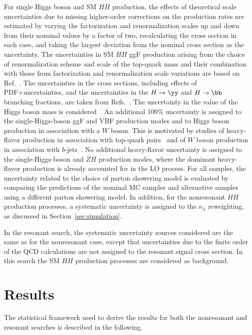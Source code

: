 \documentclass[PAPER, cernpreprint, texlive=2016, paper=a4, USenglish, texmf]{atlasdoc}
\begin{document}
For single Higgs boson and SM $HH$ production, the effects of theoretical scale uncertainties due to missing higher-order corrections on the production rates are estimated by varying the factorization and renormalization scales up and down from their nominal values by a factor of two, recalculating the cross section in each case, and taking the largest deviation from the nominal cross section as the uncertainty. The uncertainties in SM $HH$ ggF production arising from the choice of renormalization scheme and scale of the top-quark mass and their combination with those from factorization and renormalization scale variations are based on Ref.~\cite{Baglio:2020wgt}. The uncertainties in the cross sections, including effects of PDF+\alphas uncertainties, and the uncertainties in the $H \rightarrow \yy $ and $H \rightarrow \bb$ branching fractions, are taken from Refs.~\cite{DiMicco:2019ngk,deFlorian:2016spz}. The uncertainty in the value of the Higgs boson mass is considered~\cite{HIGG-2014-14}. An additional 100\% uncertainty is assigned to
the single-Higgs-boson ggF and  VBF production modes and to Higgs boson production in association with a $W$ boson. This is motivated by studies of heavy-flavor production in association with top-quark pairs~\cite{TOPQ-2017-12,TOPQ-2012-16-corr} and of $W$ boson production in association with $b$-jets~\cite{STDM-2012-11}.
No additional heavy-flavor uncertainty is assigned to the single-Higgs-boson \tth{} and $ZH$ production modes, where the dominant heavy-flavor production is already accounted for in the LO process.
For all samples, the uncertainty related to the choice of parton showering model is evaluated by comparing the predictions of the nominal MC samples and alternative samples using a different parton showering model.
In addition, for the nonresonant $HH$ production processes, a systematic uncertainty is assigned to the $\kappa_{\lambda}$ reweighting, as discussed in Section~\ref{sec:simulation}.
 
 
In the resonant search, the systematic uncertainty sources considered are the same as for the nonresonant case, except that uncertainties due to the finite order of the QCD calculations are not assigned to the resonant signal cross section.
In this search the SM $HH$ production processes are considered as background. 
 
\section{Results}
The statistical framework used to derive the results for both the nonresonant and resonant searches is described in the following.
 
\end{document}
